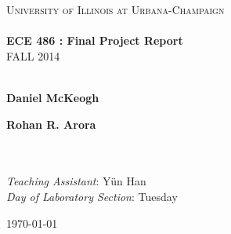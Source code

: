 \begin{titlepage}
	\begin{center}

		\textsc{\LARGE University of Illinois at Urbana-Champaign}\\[1.5cm]

		\HRule\\[0.4cm]
		{\huge \bfseries ECE 486 : Final Project Report \\[0.4cm] }
		\uppercase{Fall 2014}\\[0.5cm]

		\HRule\\[1.5cm]

		\noindent
		\begin{minipage}{0.4\textwidth}
			\begin{flushleft} \large
				\textbf{Daniel McKeogh}
			\end{flushleft}
		\end{minipage}%
		\begin{minipage}{0.4\textwidth}
			\begin{flushright} \large
				\textbf{Rohan R. Arora}
			\end{flushright}
		\end{minipage}
		\\~\\
		\textit{Teaching Assistant}: Y\"{u}n Han\\
		\textit{Day of Laboratory Section}: Tuesday

		\vfill

		{\large \today}

	\end{center}
\end{titlepage}








